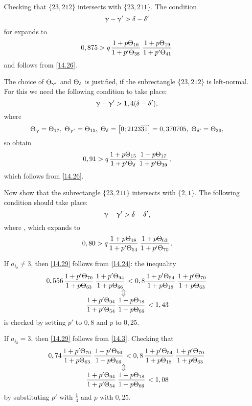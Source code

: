 Checking that $\{23, 212\}$ intersects with $\{23, 211\}$.
The condition
\begin{equation*}
	\upgamma - \upgamma' > \delta - \delta'
\end{equation*}
for
expands to
\begin{equation*}
	0,875 > q \up{16}{38} \up{19}{41}
\end{equation*}
and follows from \ref{14.26}.

The choice of $\Theta_{\upgamma'}$ and $\Theta_{\delta}$ is justified,
if the subrectangle $\{23, 212\}$ is left-normal.
For this we need the following condition to take place:
\begin{equation*}
	\upgamma - \upgamma' > 1,4 (\delta - \delta'),
\end{equation*}
where
\begin{equation*}
	\Theta_{\upgamma} = \Theta_{17},\;
	\Theta_{\upgamma'} = \Theta_{15},\;
	\Theta_{\delta} = \left[0; 2123\overline{31}\right] = 0,370705,\;
	\Theta_{\delta'} = \Theta_{39},
\end{equation*}
so obtain
\begin{equation*}
	0,91 > q \up{15}{\d} \up{17}{39},
\end{equation*}
which follows from \ref{14.26}.

Now show that the subrectangle $\{23, 211\}$ intersects with $\{2, 1\}$.
The following condition should take place:
\begin{equation*}
	\upgamma - \upgamma' > \delta - \delta',
\end{equation*}
where
,
which expands to
\begin{equation}\label{14.29}
	0,80 > q \up{18}{54} \up{63}{70}.
\end{equation}

If $a_{i_2} \ne 3$, then \ref{14.29} follows from \ref{14.24}:
the inequality
\begin{gather*}
	0,556 \pu{70}{63} \pu{94}{66} < 0,8 \pu{54}{18} \pu{70}{63}\\
	\ArrowBetweenLines
	\pp{94}{54} \uu{18}{66} < 1,43
\end{gather*}
is checked by setting $p'$ to $0,8$ and $p$ to $0,25$.

If $a_{i_2} = 3$, then \ref{14.29} follows from \ref{14.3}.
Checking that
\begin{gather*}
	0,74 \pu{70}{63} \pu{90}{66} < 0,8 \pu{54}{18} \pu{70}{63}\\
	\ArrowBetweenLines
	\pp{94}{54} \uu{18}{66} < 1,08
\end{gather*}
by substituting $p'$ with $\frac{1}{3}$ and $p$ with $0,25$.

